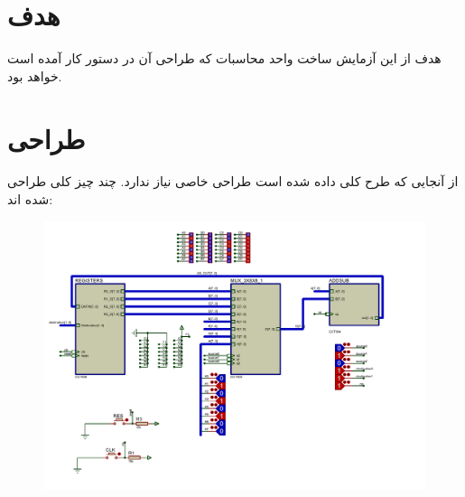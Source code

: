 \documentclass{article}
\begin{document}
\section{هدف}
هدف از این آزمایش ساخت واحد محاسبات که طراحی آن در دستور کار آمده است خواهد بود.

\section{طراحی}
از آنجایی که طرح کلی داده شده است طراحی خاصی نیاز ندارد. چند چیز کلی طراحی شده اند:
\begin{figure}[H]
	\centering
	\includegraphics[scale=0.5,page=1]{graphics}
\end{figure}
\end{document}
